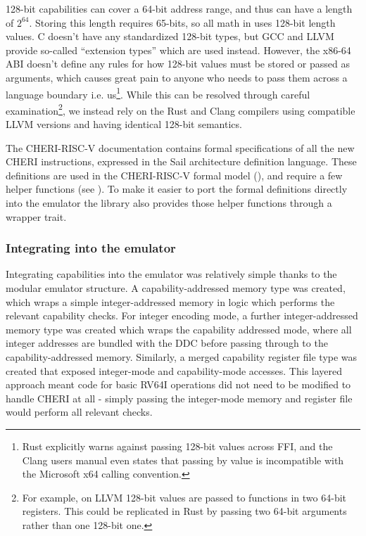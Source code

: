 128-bit capabilities can cover a 64-bit address range, and thus can have a length of $2^{64}$.
Storing this length requires 65-bits, so all math in  uses 128-bit length values.
C doesn't have any standardized 128-bit types, but GCC and LLVM provide so-called ``extension types'' which are used instead.
However, the x86-64 ABI doesn't define any rules for how 128-bit values must be stored or passed as arguments, which causes great pain to anyone who needs to pass them across a language boundary i.e. us\footnote{Rust explicitly warns against passing 128-bit values across FFI, and the Clang users manual even states that passing  by value is incompatible with the Microsoft x64 calling convention.}.
While this can be resolved through careful examination\footnote{For example, on LLVM 128-bit values are passed to functions in two 64-bit registers. This could be replicated in Rust by passing two 64-bit arguments rather than one 128-bit one.}, we instead rely on the Rust and Clang compilers using compatible LLVM versions and having identical 128-bit semantics.


The CHERI-RISC-V documentation contains formal specifications of all the new CHERI instructions, expressed in the Sail architecture definition  language.
These definitions are used in the CHERI-RISC-V formal model (), and require a few helper functions (see \cite[Chapter 8.2]{TR-951}).
To make it easier to port the formal definitions directly into the emulator the  library also provides those helper functions through a wrapper trait.


\subsubsection{Integrating into the emulator}
Integrating capabilities into the emulator was relatively simple thanks to the modular emulator structure.
A capability-addressed memory type was created, which wraps a simple integer-addressed memory in logic which performs the relevant capability checks.
For integer encoding mode, a further integer-addressed memory type was created which wraps the capability addressed mode, where all integer addresses are bundled with the DDC before passing through to the capability-addressed memory.
Similarly, a merged capability register file type was created that exposed integer-mode and capability-mode accesses.
This layered approach meant code for basic RV64I operations did not need to be modified to handle CHERI at all - simply passing the integer-mode memory and register file would perform all relevant checks.

